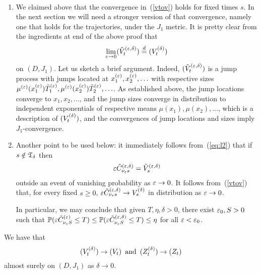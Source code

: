 \begin{rmk}
 \label{rmk:conv2}\mbox{ }
\begin{enumerate}
\item We claimed above that the convergence in~(\ref{vtov}) holds for fixed times $s$.
In the next section we will need a stronger version of that convergence, namely one that holds for 
the trajectories, under the $J_1$ metric. It is pretty clear from the ingredients at end of the above proof that
\begin{equation}
\label{conv4}
\lim_{\eps\to0}(\bved_t)\stackrel{d}=(\bvd_t)
\end{equation}
on $(D,J_1)$. Let us sketch a brief argument. Indeed, $(\tilde V^{(\varepsilon,\delta)}_t)$ is a jump process with jumps located at $x^{(\varepsilon)}_1,x^{(\varepsilon)}_2,\ldots$ with respective sizes
$\mu^{(\varepsilon)}(x^{(\varepsilon)}_1)\tilde T^{(\varepsilon)}_1,\mu^{(\varepsilon)}(x^{(\varepsilon)}_2)\tilde T^{(\varepsilon)}_2,\ldots$. As established above, the jump
locations converge to $x_1,x_2,\ldots$, and the jump sizes converge in distribution to independent exponentials of respective
means $\mu(x_1),\mu(x_2),\ldots$, which is a description of $(V^{(\delta)}_t)$, and the convergences of jump locations and sizes
imply $J_1$-convergence.




\item Another point to be used below: it immediately follows from~(\ref{eq:l2}) that if $s\notin{\mathfrak T}_\delta$ then
\begin{equation}
\label{cv}
\eps\bced_{\nu_\eps s}=\bved_s
\end{equation} 
outside an event of vanishing probability as $\varepsilon\to0$. It follows from~(\ref{vtov}) that,
for every fixed $s\geq0$, $\varepsilon\tilde C^{(\varepsilon,\delta)}_{\nu_\varepsilon s}\to V^{(\delta)}_s$
in distribution as $\varepsilon\to0$. 





In particular, we may conclude that given $T,\eta,\delta>0$, there exist $\varepsilon_0,S>0$
such that ${\mathbb P}(\varepsilon\tilde C^{(\varepsilon)}_{\nu_\varepsilon S}\leq T)\leq{\mathbb P}(\varepsilon\tilde C^{(\varepsilon,\delta)}_{\nu_\varepsilon S}\leq T)\leq\eta$ for all $\varepsilon<\varepsilon_0$.

\end{enumerate}


\end{rmk}


\begin{lm}
 \label{rmk:conv_bvd}
We have that
\begin{equation}
\label{eq:c5a}
(\bvd_t)\to(V_t)\, \mbox{ and }\, (\bzd_t)\to(Z_t)
\end{equation}
almost surely on $(D,J_1)$ as $\delta\to0$. 
\end{lm}



